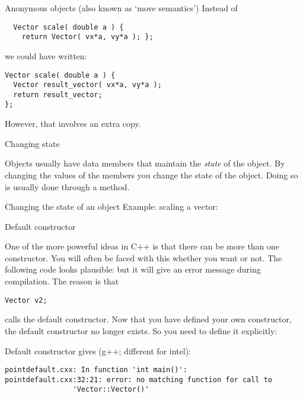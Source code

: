 \begin{block}{Anonymous objects}
  \label{sl:obj-return-move}
  (also known as `move semantics')
  Instead of
\begin{lstlisting}
  Vector scale( double a ) {
    return Vector( vx*a, vy*a ); };
\end{lstlisting}
  we could have written:
\begin{lstlisting}
Vector scale( double a ) {
  Vector result_vector( vx*a, vy*a );
  return result_vector;
};
\end{lstlisting}
However, that involves an extra copy.
\end{block}

 {Changing state}

Objects usually have data members that maintain the
\emph{state} of the object. By changing the
values of the members you change the state of the object. Doing so is
usually done through a method.

\begin{block}{Changing the state of an object}
  \label{sl:state-method}
  Example: scaling a vector:
\end{block}

 {Default constructor}
\label{sec:default-constructor}

One of the more powerful ideas in C++ is that there can be more than
one constructor. You will often be faced with this whether you want or
not. The following code looks plausible:
%
%
but it will give an error message during compilation. The reason is
that 
\begin{lstlisting}
Vector v2;
\end{lstlisting}
calls the default constructor. Now that you have defined your own
constructor, the default constructor no longer exists. So you need to
define it explicitly:
%

\begin{slide}{Default constructor}
  \label{sl:obj-def-construct1}
  gives (g++; different for intel):
\begin{lstlisting}
pointdefault.cxx: In function 'int main()':
pointdefault.cxx:32:21: error: no matching function for call to
                'Vector::Vector()'
\end{lstlisting}
\end{slide}

